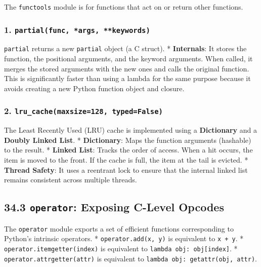 The \passthrough{\lstinline!functools!} module is for functions that act
on or return other functions.

\hypertarget{partialfunc-args-keywords}{%
\subsubsection{\texorpdfstring{1.
\texttt{partial(func,\ *args,\ **keywords)}}{1. partial(func, *args, **keywords)}}\label{partialfunc-args-keywords}}

\passthrough{\lstinline!partial!} returns a new
\passthrough{\lstinline!partial!} object (a C struct). *
\textbf{Internals}: It stores the function, the positional arguments,
and the keyword arguments. When called, it merges the stored arguments
with the new ones and calls the original function. This is significantly
faster than using a lambda for the same purpose because it avoids
creating a new Python function object and closure.

\hypertarget{lru_cachemaxsize128-typedfalse}{%
\subsubsection{\texorpdfstring{2.
\texttt{lru\_cache(maxsize=128,\ typed=False)}}{2. lru\_cache(maxsize=128, typed=False)}}\label{lru_cachemaxsize128-typedfalse}}

The Least Recently Used (LRU) cache is implemented using a
\textbf{Dictionary} and a \textbf{Doubly Linked List}. *
\textbf{Dictionary}: Maps the function arguments (hashable) to the
result. * \textbf{Linked List}: Tracks the order of access. When a hit
occurs, the item is moved to the front. If the cache is full, the item
at the tail is evicted. * \textbf{Thread Safety}: It uses a reentrant
lock to ensure that the internal linked list remains consistent across
multiple threads.

\hypertarget{operator-exposing-c-level-opcodes}{%
\subsection{\texorpdfstring{34.3 \texttt{operator}: Exposing C-Level
Opcodes}{34.3 operator: Exposing C-Level Opcodes}}\label{operator-exposing-c-level-opcodes}}

The \passthrough{\lstinline!operator!} module exports a set of efficient
functions corresponding to Python's intrinsic operators. *
\passthrough{\lstinline!operator.add(x, y)!} is equivalent to
\passthrough{\lstinline!x + y!}. *
\passthrough{\lstinline!operator.itemgetter(index)!} is equivalent to
\passthrough{\lstinline!lambda obj: obj[index]!}. *
\passthrough{\lstinline!operator.attrgetter(attr)!} is equivalent to
\passthrough{\lstinline!lambda obj: getattr(obj, attr)!}.

